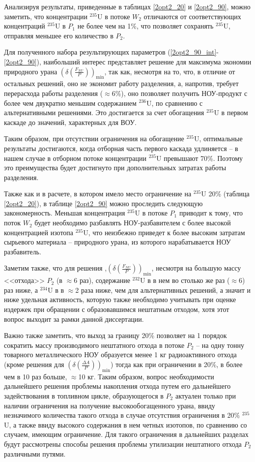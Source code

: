 Анализируя результаты, приведенные в таблицах \ref{2opt2_20} и \ref{2opt2_90}, можно заметить, что концентрации $^{235}$U в потоке $W_2$ отличаются от соответствующих концентраций $^{235}$U в  $P_1$ не более чем на 1\%, что позволяет сохранять $^{235}$U, отправляя меньшее его количество в $P_2$.

Для полученного набора результирующих параметров (\ref{2opt2_90_int}-\ref{2opt2_90}), наибольший интерес представляет решение для максимума экономии природного урана $(\delta(\frac{F_{NU}}{P}))_\text{min}$, так как, несмотря на то, что, в отличие от остальных решений, оно не экономит работу разделения, а, напротив, требует перерасхода работы разделения ($\approx$6\%), оно позволяет получить НОУ-продукт с более чем двукратно меньшим содержанием $^{236}$U, по сравнению с альтернативными решениями. Это достигается за счет обогащения $^{235}$U в первом каскаде до значений, характерных для ВОУ.

Таким образом, при отсутствии ограничения на обогащение $^{235}$U, оптимальные результаты достигаются, когда отборная часть первого каскада удлиняется -- в нашем случае в отборном потоке концентрации $^{235}$U превышают 70\%. Поэтому это преимущества будет достигнуто при дополнительных затратах работы разделения.

Также как и в расчете, в котором имело место ограничение на $^{235}$U 20\% (таблица \ref{2opt2_20}), в таблице \ref{2opt2_90} можно проследить следующую закономерность. Меньшая концентрация $^{235}$U в потоке $P_{1}$ приводит к тому, что поток $W_{2}$ будет необходимо разбавлять НОУ-разбавителем с более высокой концентрацией изотопа $^{235}$U, что неизбежно приведет к более высоким затратам сырьевого материала -- природного урана, из которого нарабатывается НОУ разбавитель.

Заметим также, что для решения ,$(\delta(\frac{F_{NU}}{P}))_\text{min}$, несмотря на большую массу <<отхода>> $P_{2}$ (в $\approx$6 раз), содержание $^{232}$U в в нем во столько же раз ($\approx$6) раз ниже, а $^{234}$U в в $\approx$2 раза ниже, чем для альтернативных решений, а значит и ниже удельная активность, которую также необходимо учитывать при оценке издержек при обращении с образовавшимся нештатным отходом, хотя этот вопрос выходит за рамки данной диссертации.

Важно также заметить, что выход за границу 20\% позволяет на 1 порядок сократить массу производимого нештатного отхода в потоке $P_{2}$ -- на одну тонну товарного металлического НОУ образуется менее 1 кг радиоактивного отхода (кроме решения для $(\delta(\frac{\Delta A}{P}))_\text{min}$) тогда как при ограничении в 20\%, в более чем в 10 раз больше, $\approx$10 кг. Таким образом, вопрос необходимости дальнейшего решения проблемы накопления отхода путем его дальнейшего задействования в топливном цикле, образующегося в $P_{2}$ актуален только при наличии ограничения на получение высокообогащенного урана, ввиду незначимого количества такого отхода в случае отсутствия ограничения в 20\% $^{235}$U, а также ввиду высокого содержания в нем четных изотопов, по сравнению со случаем, имеющим ограничение. Для такого ограничения в дальнейших разделах будут рассмотрены способы решения проблемы утилизации нештатного отхода $P_{2}$ различными путями. 



